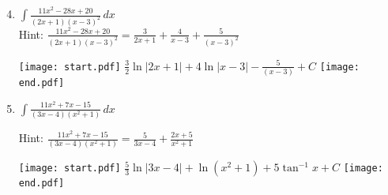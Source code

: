 \documentclass[12pt]{article}
\begin{document}

\begin{enumerate}
\setcounter{enumi}{3}

\item $\int \frac{11x^2-28x+20}{(2x+1)(x-3)^2} \,dx$\\

Hint: $\frac{11x^2-28x+20}{(2x+1)(x-3)^2} = \frac{3}{2x+1}+\frac{4}{x-3}+\frac{5}{(x-3)^2}$

\texttt{[image: start.pdf]}
{{$\frac{3}{2}\ln{|2x+1|}+4\ln{|x-3|}-\frac{5}{(x-3)}+C$}}
\texttt{[image: end.pdf]}


\item $\int \frac{11x^2+7x-15}{(3x-4)(x^2+1)} \,dx$

Hint: $\frac{11x^2+7x-15}{(3x-4)(x^2+1)} = \frac{5}{3x-4}+\frac{2x+5}{x^2+1}$

\texttt{[image: start.pdf]}
{{$\frac{5}{3}\ln{|3x-4|}+\ln(x^2+1)+5\tan^{-1}{x}+C$}}
\texttt{[image: end.pdf]}


\end{enumerate}

\end{document}
